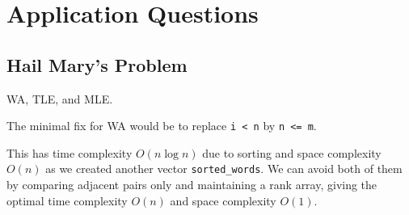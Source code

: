 \documentclass[12pt]{article}
\renewcommand{\t}{\texttt}
\begin{document}
\setcounter{section}{1}
\section{Application Questions}
\subsection{Hail Mary’s Problem}
WA, TLE, and MLE.

The minimal fix for WA would be to replace \t{i < n} by \t{n <= m}.

This has time complexity $O(n\log n)$ due to sorting and space complexity $O(n)$ as we created another vector \t{sorted\_words}. We can avoid both of them by comparing adjacent pairs only and maintaining a rank array, giving the optimal time complexity $O(n)$ and space complexity $O(1)$.
\end{document}

